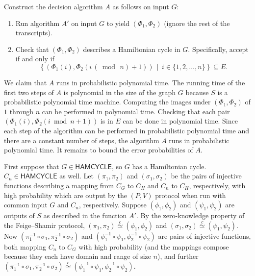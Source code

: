 \documentclass[draft]{article}
\newcommand{\lang}[1]{{\ensuremath{\mathsf{#1}}}}
\newcommand{\cid}{\overset{c}{\simeq}}
\renewcommand{\pmod}[1]{\,(\bmod{\,#1})}
\begin{document}
\begin{enumerate}
  Construct the decision algorithm $A$ as follows on input $G$:
  \begin{enumerate}
  \item Run algorithm $A'$ on input $G$ to yield $(\Phi_1, \Phi_2)$ (ignore the rest of the transcripts).
  \item 
    Check that $(\Phi_1, \Phi_2)$ describes a Hamiltonian cycle in $G$.
    Specifically, accept if and only if
    \begin{displaymath}
      \left\{(\Phi_1(i), \Phi_2(i \pmod{n} + 1)) \,\middle|\, i \in \{1, 2, \ldots, n\}\right\}\subseteq E.
    \end{displaymath}
  \end{enumerate}

  We claim that $A$ runs in probabilistic polynomial time.
  The running time of the first two steps of $A$ is polynomial in the size of the graph $G$ because $S$ is a probabilistic polynomial time machine.
  Computing the images under $(\Phi_1, \Phi_2)$ of $1$ through $n$ can be performed in polynomial time.
  Checking that each pair $(\Phi_1(i), \Phi_2(i \bmod{n} + 1))$ is in $E$ can be done in polynomial time.
  Since each step of the algorithm can be performed in probabilistic polynomial time and there are a constant number of steps, the algorithm $A$ runs in probabilistic polynomial time.
  It remains to bound the error probabilities of $A$.

  First suppose that $G\in\lang{HAMCYCLE}$, so $G$ has a Hamiltonian cycle.
  $C_n\in\lang{HAMCYCLE}$ as well.
  Let $(\pi_1, \pi_2)$ and $(\sigma_1, \sigma_2)$ be the pairs of injective functions describing a mapping from $C_G$ to $C_H$ and $C_n$ to $C_H$, respectively, with high probability which are output by the $(P, V)$ protocol when run with common input $G$ and $C_n$, respectively.
  Suppose $(\phi_1, \phi_2)$ and $(\psi_1, \psi_2)$ are outputs of $S$ as described in the function $A'$.
  By the zero-knowledge property of the Feige--Shamir protocol, $(\pi_1, \pi_2)\cid (\phi_1, \phi_2)$ and $(\sigma_1, \sigma_2)\cid(\psi_1, \psi_2)$.
  Now $(\pi_1^{-1}\circ\sigma_1, \pi_2^{-1}\circ\sigma_2)$ and $(\phi_1^{-1}\circ\psi_1, \phi_2^{-1}\circ\psi_2)$ are pairs of injective functions, both mapping $C_n$ to $C_G$ with high probability (and the mappings compose because they each have domain and range of size $n$), and further $(\pi_1^{-1}\circ\sigma_1, \pi_2^{-1}\circ\sigma_2) \cid (\phi_1^{-1}\circ\psi_1, \phi_2^{-1}\circ\psi_2)$.


\end{enumerate}
\end{document}
